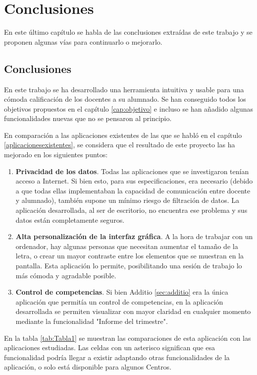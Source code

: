 \chapter{Conclusiones}
\label{cap:conclusiones}
En este último capítulo se habla de las conclusiones extraídas de este trabajo y se proponen algunas vías para continuarlo o mejorarlo.

\section{Conclusiones}
En este trabajo se ha desarrollado una herramienta intuitiva y usable para una cómoda calificación de los docentes a su alumnado. Se han conseguido todos los objetivos propuestos en el capítulo \ref{cap:objetivo} e incluso se han añadido algunas funcionalidades nuevas que no se pensaron al principio.

En comparación a las aplicaciones existentes de las que se habló en el capítulo \ref{aplicacionesexistentes}, se considera que el resultado de este proyecto las ha mejorado en los siguientes puntos:
\begin{enumerate}
	\item \textbf{Privacidad de los datos}. Todas las aplicaciones que se investigaron tenían acceso a Internet. Si bien esto, para sus especificaciones, era necesario (debido a que todas ellas implementaban la capacidad de comunicación entre docente y alumnado), también supone un mínimo riesgo de filtración de datos. La aplicación desarrollada, al ser de escritorio, no encuentra ese problema y sus datos están completamente seguros.
	\item \textbf{Alta personalización de la interfaz gráfica}. A la hora de trabajar con un ordenador, hay algunas personas que necesitan aumentar el tamaño de la letra, o crear un mayor contraste entre los elementos que se muestran en la pantalla. Esta aplicación lo permite, posibilitando una sesión de trabajo lo más cómoda y agradable posible.
	\item \textbf{Control de competencias}. Si bien Additio \ref{sec:additio} era la única aplicación que permitía un control de competencias, en la aplicación desarrollada se permiten visualizar con mayor claridad en cualquier momento mediante la funcionalidad "Informe del trimestre".
\end{enumerate}

En la tabla \ref{tab:Tabla1} se muestran las comparaciones de esta aplicación con las aplicaciones estudiadas. Las celdas con un asterisco significan que esa funcionalidad podría llegar a existir adaptando otras funcionalidades de la aplicación, o solo está disponible para algunos Centros.



